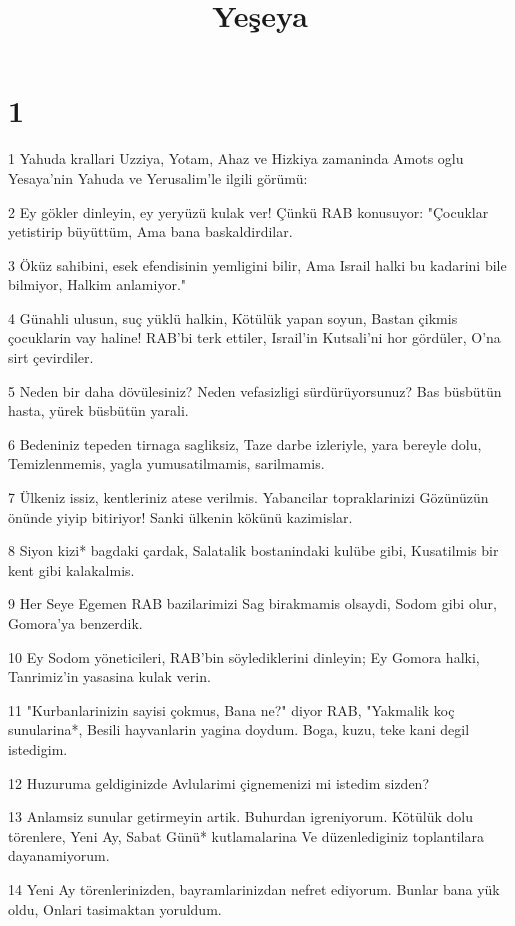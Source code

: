 

\title{Yeşeya}


\chapter{1}

\par 1 Yahuda krallari Uzziya, Yotam, Ahaz ve Hizkiya zamaninda Amots oglu Yesaya'nin Yahuda ve Yerusalim'le ilgili görümü:
\par 2 Ey gökler dinleyin, ey yeryüzü kulak ver! Çünkü RAB konusuyor: "Çocuklar yetistirip büyüttüm, Ama bana baskaldirdilar.
\par 3 Öküz sahibini, esek efendisinin yemligini bilir, Ama Israil halki bu kadarini bile bilmiyor, Halkim anlamiyor."
\par 4 Günahli ulusun, suç yüklü halkin, Kötülük yapan soyun, Bastan çikmis çocuklarin vay haline! RAB'bi terk ettiler, Israil'in Kutsali'ni hor gördüler, O'na sirt çevirdiler.
\par 5 Neden bir daha dövülesiniz? Neden vefasizligi sürdürüyorsunuz? Bas büsbütün hasta, yürek büsbütün yarali.
\par 6 Bedeniniz tepeden tirnaga sagliksiz, Taze darbe izleriyle, yara bereyle dolu, Temizlenmemis, yagla yumusatilmamis, sarilmamis.
\par 7 Ülkeniz issiz, kentleriniz atese verilmis. Yabancilar topraklarinizi Gözünüzün önünde yiyip bitiriyor! Sanki ülkenin kökünü kazimislar.
\par 8 Siyon kizi* bagdaki çardak, Salatalik bostanindaki kulübe gibi, Kusatilmis bir kent gibi kalakalmis.
\par 9 Her Seye Egemen RAB bazilarimizi Sag birakmamis olsaydi, Sodom gibi olur, Gomora'ya benzerdik.
\par 10 Ey Sodom yöneticileri, RAB'bin söylediklerini dinleyin; Ey Gomora halki, Tanrimiz'in yasasina kulak verin.
\par 11 "Kurbanlarinizin sayisi çokmus, Bana ne?" diyor RAB, "Yakmalik koç sunularina*, Besili hayvanlarin yagina doydum. Boga, kuzu, teke kani degil istedigim.
\par 12 Huzuruma geldiginizde Avlularimi çignemenizi mi istedim sizden?
\par 13 Anlamsiz sunular getirmeyin artik. Buhurdan igreniyorum. Kötülük dolu törenlere, Yeni Ay, Sabat Günü* kutlamalarina Ve düzenlediginiz toplantilara dayanamiyorum.
\par 14 Yeni Ay törenlerinizden, bayramlarinizdan nefret ediyorum. Bunlar bana yük oldu, Onlari tasimaktan yoruldum.

